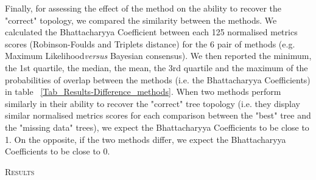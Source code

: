 \documentclass[12pt,letterpaper]{article}
\renewcommand{\section}[1]{%
\bigskip
\begin{center}
\begin{Large}
\normalfont\scshape #1
\medskip
\end{Large}
\end{center}}
\renewcommand{\subsection}[1]{%
\bigskip
\begin{center}
\begin{large}
\normalfont\itshape #1
\end{large}
\end{center}}
\begin{document}
Finally, for assessing the effect of the method on the ability to recover the "correct" topology, we compared the similarity between the methods. We calculated the Bhattacharyya Coefficient between each 125 normalised metrics scores (Robinson-Foulds and Triplets distance) for the 6 pair of methods (e.g. Maximum Likelihood\textit{versus} Bayesian consensus). We then reported the minimum, the 1st quartile, the median, the mean, the 3rd quartile and the maximum of the probabilities of overlap between the methods (i.e. the Bhattacharyya Coefficients) in table ~\ref{Tab_Results-Difference_methods}. When two methods perform similarly in their ability to recover the "correct" tree topology (i.e. they display similar normalised metrics scores for each comparison between the "best" tree and the "missing data" trees), we expect the Bhattacharyya Coefficients to be close to 1. On the opposite, if the two methods differ, we expect the Bhattacharyya Coefficients to be close to 0. 

%
%

\section{Results}


\end{document}
